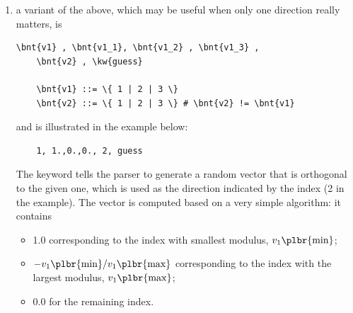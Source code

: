 \begin{enumerate}
\noindent
\textbf{Examples.}
\begin{verbatim}
    1, 1.,0.,0., 2, 0.,1.,0.
\end{verbatim}
Equivalent to the identity matrix, i.e.\ no rotation 
occurs with respect to the initial reference frame: direction 1
in the final reference frame is parallel to \texttt{1.,0.,0.}, which represents
direction 1 in the initial reference frame, while direction 2 in the final reference frame
is parallel to \texttt{0.,1.,0.}, which represents direction 2
in the initial reference frame.
\begin{verbatim}
    1, cos(pi/6.), sin(pi/6.), 0.,
        3, 0.,0.,1.
\end{verbatim}
Rotation of $ \pi/6 $ radian about
initial direction 3: direction 1 in the final reference frame results from 
composing \texttt{(pi/6.)} in initial direction 1
and \texttt{(pi/6.)}
in initial direction 2, while direction 3 in the final reference frame remains
parallel to \texttt{0.,0.,1.}, which represents direction 3 in the initial reference frame.
\begin{verbatim}
    2, 0., cos(ALPHA), sin(ALPHA),
        1, 1.,0.,0.
\end{verbatim}
Rotation of \texttt{ALPHA} (assuming the variable \texttt{ALPHA} was previously defined) about
initial direction 1: direction 2 in the final reference frame results from 
composing \texttt{(ALPHA)} in initial direction 2
and \texttt{(ALPHA)}
in initial direction 2, while direction 3 in the final reference frame remains
parallel to \texttt{0.,0.,1.}, which represents direction 3 in the initial reference frame.

\item a variant of the above, which may be useful when only one
direction really matters, is
\begin{Verbatim}[commandchars=\\\{\}]
    \bnt{v1} , \bnt{v1_1}, \bnt{v1_2} , \bnt{v1_3} ,
    \bnt{v2} , \kw{guess}

    \bnt{v1} ::= \{ 1 | 2 | 3 \}
    \bnt{v2} ::= \{ 1 | 2 | 3 \} # \bnt{v2} != \bnt{v1}
\end{Verbatim}
and is illustrated in the example below:
\begin{verbatim}
    1, 1.,0.,0., 2, guess
\end{verbatim}
The keyword  tells the parser to generate a random vector
that is orthogonal to the given one, which is used as the direction
indicated by the index (2 in the example).
The vector is computed based on a very simple algorithm: it contains
\begin{itemize}
        \item 1.0 corresponding to the index with smallest modulus,
        $v_1\plbr{\mathrm{min}}$;
	\item $-v_1\plbr{\mathrm{min}}/v_1\plbr{\mathrm{max}}$
	corresponding to the index with the largest modulus,
	$v_1\plbr{\mathrm{max}}$;
	\item 0.0 for the remaining index.
\end{itemize}


\end{enumerate}

